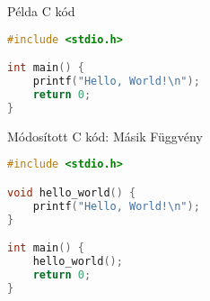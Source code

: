 \documentclass[12]{article}
\begin{document}
\begin{ccode}
\caption{Példa C kód}
\begin{lstlisting}[language=C]
#include <stdio.h>

int main() {
    printf("Hello, World!\n");
    return 0;
}
\end{lstlisting}
\end{ccode}

\begin{ccode}
\caption{Módosított C kód: Másik Függvény}
\begin{lstlisting}[language=C]
#include <stdio.h>

void hello_world() {
    printf("Hello, World!\n");
}

int main() {
    hello_world();
    return 0;
}
\end{lstlisting}
\end{ccode}
\end{document}
